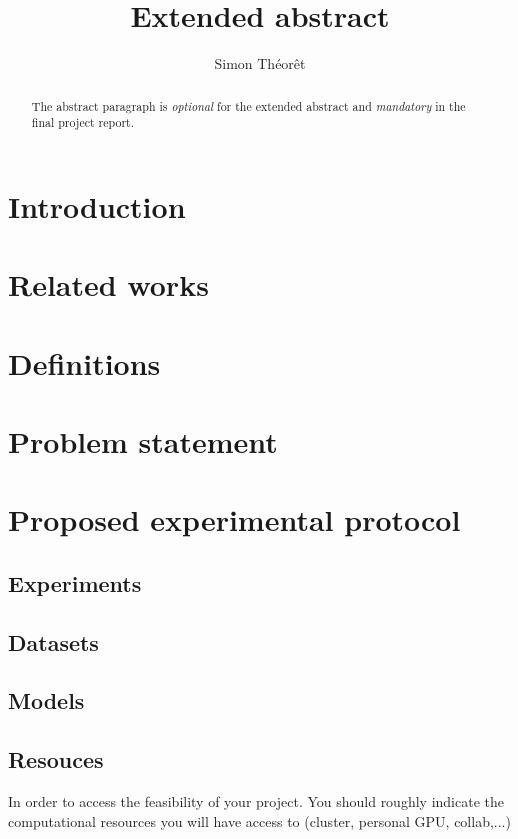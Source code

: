 \documentclass{article}
\title{Extended abstract}
\author{Simon Théorêt}
\begin{document}
\maketitle

\begin{abstract}
  The abstract paragraph is \emph{optional} for the extended abstract and \emph{mandatory} in the final project report.
\end{abstract}

\section{Introduction}
\section{Related works}
\section{Definitions}
\section{Problem statement}
\section{Proposed experimental protocol}
\subsection{Experiments}
\subsection{Datasets}
\subsection{Models}
\subsection{Resouces}

In order to access the feasibility of your project. You should roughly indicate the computational resources you will have access to (cluster, personal GPU, collab,...)
\end{document}
